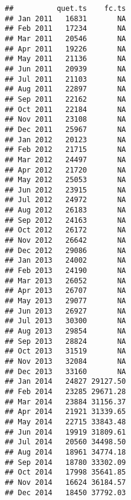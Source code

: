\documentclass[
]{article}
\newenvironment{Shaded}{\begin{snugshade}}{\end{snugshade}}
\newcommand{\AttributeTok}[1]{\textcolor[rgb]{0.13,0.29,0.53}{#1}}
\newcommand{\CommentTok}[1]{\textcolor[rgb]{0.56,0.35,0.01}{\textit{#1}}}
\newcommand{\DecValTok}[1]{\textcolor[rgb]{0.00,0.00,0.81}{#1}}
\newcommand{\FloatTok}[1]{\textcolor[rgb]{0.00,0.00,0.81}{#1}}
\newcommand{\FunctionTok}[1]{\textcolor[rgb]{0.13,0.29,0.53}{\textbf{#1}}}
\newcommand{\NormalTok}[1]{#1}
\newcommand{\OtherTok}[1]{\textcolor[rgb]{0.56,0.35,0.01}{#1}}
\newcommand{\SpecialCharTok}[1]{\textcolor[rgb]{0.81,0.36,0.00}{\textbf{#1}}}
\begin{document}
\begin{Shaded}
\end{Shaded}

\begin{verbatim}
##          quet.ts    fc.ts
## Jan 2011   16831       NA
## Feb 2011   17234       NA
## Mar 2011   20546       NA
## Apr 2011   19226       NA
## May 2011   21136       NA
## Jun 2011   20939       NA
## Jul 2011   21103       NA
## Aug 2011   22897       NA
## Sep 2011   22162       NA
## Oct 2011   22184       NA
## Nov 2011   23108       NA
## Dec 2011   25967       NA
## Jan 2012   20123       NA
## Feb 2012   21715       NA
## Mar 2012   24497       NA
## Apr 2012   21720       NA
## May 2012   25053       NA
## Jun 2012   23915       NA
## Jul 2012   24972       NA
## Aug 2012   26183       NA
## Sep 2012   24163       NA
## Oct 2012   26172       NA
## Nov 2012   26642       NA
## Dec 2012   29086       NA
## Jan 2013   24002       NA
## Feb 2013   24190       NA
## Mar 2013   26052       NA
## Apr 2013   26707       NA
## May 2013   29077       NA
## Jun 2013   26927       NA
## Jul 2013   30300       NA
## Aug 2013   29854       NA
## Sep 2013   28824       NA
## Oct 2013   31519       NA
## Nov 2013   32084       NA
## Dec 2013   33160       NA
## Jan 2014   24827 29127.50
## Feb 2014   23285 29671.28
## Mar 2014   23884 31156.37
## Apr 2014   21921 31339.65
## May 2014   22715 33843.48
## Jun 2014   19919 31809.61
## Jul 2014   20560 34498.50
## Aug 2014   18961 34774.18
## Sep 2014   18780 33302.09
## Oct 2014   17998 35641.85
## Nov 2014   16624 36184.57
## Dec 2014   18450 37792.03
\end{verbatim}
\end{document}
